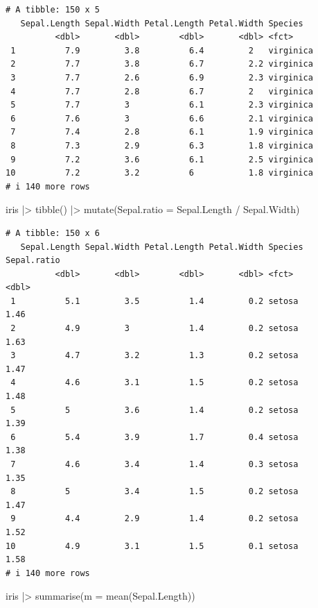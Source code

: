 \documentclass[
  letterpaper,
  DIV=11,
  numbers=noendperiod]{scrreprt}
\newenvironment{Shaded}{\begin{snugshade}}{\end{snugshade}}
\newcommand{\AttributeTok}[1]{\textcolor[rgb]{0.40,0.45,0.13}{#1}}
\newcommand{\FunctionTok}[1]{\textcolor[rgb]{0.28,0.35,0.67}{#1}}
\newcommand{\NormalTok}[1]{\textcolor[rgb]{0.00,0.23,0.31}{#1}}
\newcommand{\SpecialCharTok}[1]{\textcolor[rgb]{0.37,0.37,0.37}{#1}}
\begin{document}
\begin{verbatim}
# A tibble: 150 x 5
   Sepal.Length Sepal.Width Petal.Length Petal.Width Species  
          <dbl>       <dbl>        <dbl>       <dbl> <fct>    
 1          7.9         3.8          6.4         2   virginica
 2          7.7         3.8          6.7         2.2 virginica
 3          7.7         2.6          6.9         2.3 virginica
 4          7.7         2.8          6.7         2   virginica
 5          7.7         3            6.1         2.3 virginica
 6          7.6         3            6.6         2.1 virginica
 7          7.4         2.8          6.1         1.9 virginica
 8          7.3         2.9          6.3         1.8 virginica
 9          7.2         3.6          6.1         2.5 virginica
10          7.2         3.2          6           1.8 virginica
# i 140 more rows
\end{verbatim}

\begin{Shaded}
\begin{Highlighting}[]
\NormalTok{iris }\SpecialCharTok{|\textgreater{}} \FunctionTok{tibble}\NormalTok{() }\SpecialCharTok{|\textgreater{}} \FunctionTok{mutate}\NormalTok{(}\AttributeTok{Sepal.ratio =}\NormalTok{ Sepal.Length }\SpecialCharTok{/}\NormalTok{ Sepal.Width)}
\end{Highlighting}
\end{Shaded}

\begin{verbatim}
# A tibble: 150 x 6
   Sepal.Length Sepal.Width Petal.Length Petal.Width Species Sepal.ratio
          <dbl>       <dbl>        <dbl>       <dbl> <fct>         <dbl>
 1          5.1         3.5          1.4         0.2 setosa         1.46
 2          4.9         3            1.4         0.2 setosa         1.63
 3          4.7         3.2          1.3         0.2 setosa         1.47
 4          4.6         3.1          1.5         0.2 setosa         1.48
 5          5           3.6          1.4         0.2 setosa         1.39
 6          5.4         3.9          1.7         0.4 setosa         1.38
 7          4.6         3.4          1.4         0.3 setosa         1.35
 8          5           3.4          1.5         0.2 setosa         1.47
 9          4.4         2.9          1.4         0.2 setosa         1.52
10          4.9         3.1          1.5         0.1 setosa         1.58
# i 140 more rows
\end{verbatim}

\begin{Shaded}
\begin{Highlighting}[]
\NormalTok{iris }\SpecialCharTok{|\textgreater{}} \FunctionTok{summarise}\NormalTok{(}\AttributeTok{m =} \FunctionTok{mean}\NormalTok{(Sepal.Length))}
\end{Highlighting}
\end{Shaded}
\end{document}
